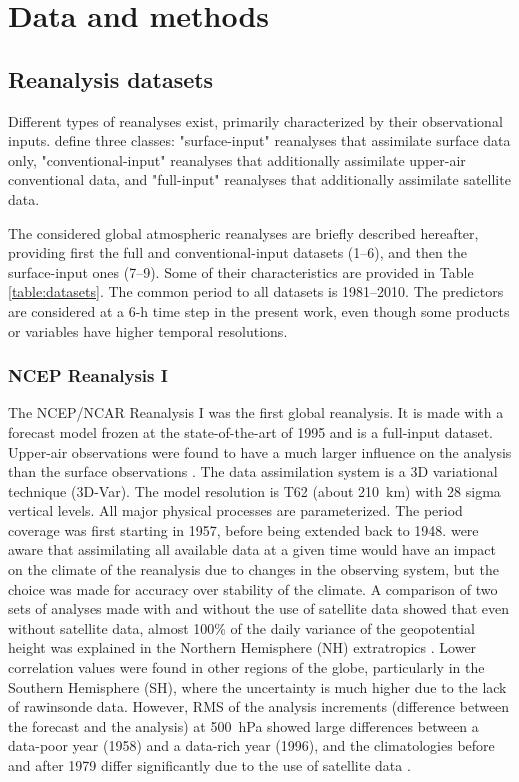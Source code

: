 \documentclass{ametsoc}
\begin{document}
\section{Data and methods}
\label{sec:data}

\subsection{Reanalysis datasets}

Different types of reanalyses exist, primarily characterized by their observational inputs. \citet{Fujiwara2017} define three classes: "surface-input" reanalyses that assimilate surface data only, "conventional-input" reanalyses that additionally assimilate upper-air conventional data, and "full-input" reanalyses that additionally assimilate satellite data.

The considered global atmospheric reanalyses are briefly described hereafter, providing first the full and conventional-input datasets (1--6), and then the surface-input ones (7--9). Some of their characteristics are provided in Table \ref{table:datasets}. The common period to all datasets is 1981--2010. The predictors are considered at a 6-h time step in the present work, even though some products or variables have higher temporal resolutions.


\subsubsection{NCEP Reanalysis I}

The NCEP/NCAR Reanalysis I \citep[NR-1 --][]{Kalnay1996, Kistler2001} was the first global reanalysis. It is made with a forecast model frozen at the state-of-the-art of 1995 and is a full-input dataset. Upper-air observations were found to have a much larger influence on the analysis than the surface observations \citep{Kistler2001}. The data assimilation system is a 3D variational technique (3D-Var). The model resolution is T62 (about 210~km) with 28 sigma vertical levels. All major physical processes are parameterized. The period coverage was first starting in 1957, before being extended back to 1948. \citet{Kalnay1996} were aware that assimilating all available data at a given time would have an impact on the climate of the reanalysis due to changes in the observing system, but the choice was made for accuracy over stability of the climate. A comparison of two sets of analyses made with and without the use of satellite data showed that even without satellite data, almost 100\% of the daily variance of the geopotential height was explained in the Northern Hemisphere (NH) extratropics \citep{Kalnay1996}. Lower correlation values were found in other regions of the globe, particularly in the Southern Hemisphere (SH), where the uncertainty is much higher due to the lack of rawinsonde data. However, RMS of the analysis increments (difference between the forecast and the analysis) at 500~hPa showed large differences between a data-poor year (1958) and a data-rich year (1996), and the climatologies before and after 1979 differ significantly due to the use of satellite data \citep{Kistler2001}.
\end{document}
